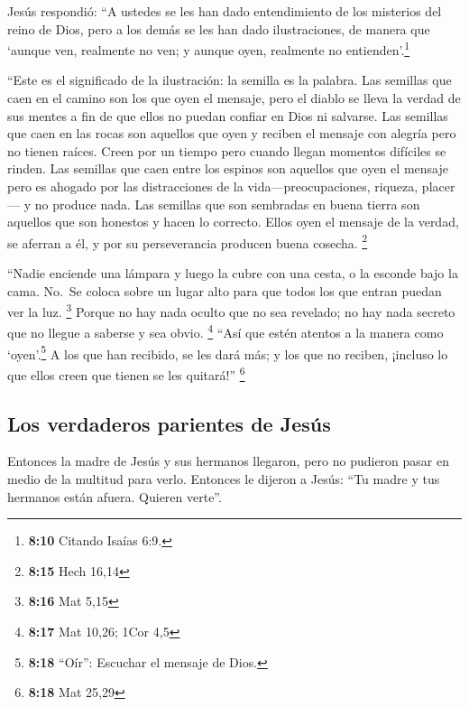  Jesús respondió: ``A ustedes se les han dado
entendimiento de los misterios del reino de Dios, pero a los demás se
les han dado ilustraciones, de manera que `aunque ven, realmente no ven;
y aunque oyen, realmente no entienden'.\footnote{\textbf{8:10} Citando
  Isaías 6:9.}

 ``Este es el significado de la ilustración: la semilla
es la palabra.  Las semillas que caen en el camino son
los que oyen el mensaje, pero el diablo se lleva la verdad de sus mentes
a fin de que ellos no puedan confiar en Dios ni salvarse.
 Las semillas que caen en las rocas son aquellos que oyen
y reciben el mensaje con alegría pero no tienen raíces. Creen por un
tiempo pero cuando llegan momentos difíciles se rinden. 
Las semillas que caen entre los espinos son aquellos que oyen el mensaje
pero es ahogado por las distracciones de la vida---preocupaciones,
riqueza, placer--- y no produce nada.  Las semillas que
son sembradas en buena tierra son aquellos que son honestos y hacen lo
correcto. Ellos oyen el mensaje de la verdad, se aferran a él, y por su
perseverancia producen buena cosecha. \footnote{\textbf{8:15} Hech 16,14}

 ``Nadie enciende una lámpara y luego la cubre con una
cesta, o la esconde bajo la cama. No.~Se coloca sobre un lugar alto para
que todos los que entran puedan ver la luz. \footnote{\textbf{8:16} Mat
  5,15}  Porque no hay nada oculto que no sea revelado;
no hay nada secreto que no llegue a saberse y sea obvio. \footnote{\textbf{8:17}
  Mat 10,26; 1Cor 4,5}  ``Así que estén atentos a la
manera como `oyen'.\footnote{\textbf{8:18} ``Oír'': Escuchar el mensaje
  de Dios.} A los que han recibido, se les dará más; y los que no
reciben, ¡incluso lo que ellos creen que tienen se les quitará!''
\footnote{\textbf{8:18} Mat 25,29}

\hypertarget{los-verdaderos-parientes-de-jesuxfas}{%
\subsection{Los verdaderos parientes de
Jesús}\label{los-verdaderos-parientes-de-jesuxfas}}

 Entonces la madre de Jesús y sus hermanos llegaron, pero
no pudieron pasar en medio de la multitud para verlo. 
Entonces le dijeron a Jesús: ``Tu madre y tus hermanos están afuera.
Quieren verte''.

